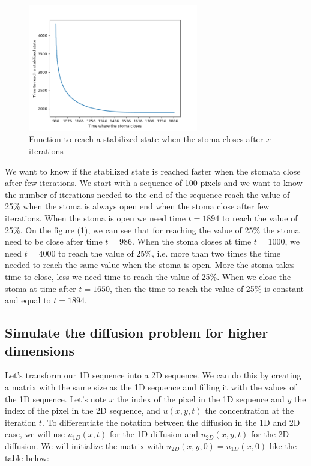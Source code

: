 \begin{figure}[htb]
    \center
    \includegraphics[width=0.66\textwidth]{figures/function_to_reach_a_stabilized_state_when_the_stoma_closes.png}
    \caption{Function to reach a stabilized state when the stoma closes after $x$ iterations}
    \label{fig:s_time_close}
\end{figure}

We want to know if the stabilized state is reached faster when the stomata close after
few iterations. We start with a sequence of 100 pixels and we want to know the number
of iterations needed to the end of the sequence reach the value of 25\% when the stoma
is always open end when the stoma close after few iterations. When the stoma is open
we need time $t=1894$ to reach the value of 25\%. On the figure 
(\ref{fig:s_time_close}), we can see that for reaching the value of 25\% the stoma
need to be close after time $t=986$. When the stoma closes at time $t=1000$, we need 
$t=4000$ to reach the value of 25\%, i.e. more than two times the time needed to reach
the same value when the stoma is open. More the stoma takes time to close, less we 
need time to reach the value of 25\%. When we close the stoma at time after $t=1650$,
then the time to reach the value of 25\% is constant and equal to $t=1894$.

\subsection{Simulate the diffusion problem for higher dimensions}

Let's transform our 1D sequence into a 2D sequence. We can do this by creating a
matrix with the same size as the 1D sequence and filling it with the values of the 
1D sequence. Let's note $x$ the index of the pixel in the 1D sequence and $y$ the index 
of the pixel in the 2D sequence, and $u(x,y,t)$ the concentration at the iteration $t$.
To differentiate the notation between the diffusion in the 1D and 2D case, we will use
$u_{1D}(x,t)$ for the 1D diffusion and $u_{2D}(x,y,t)$ for the 2D diffusion.
We will initialize the matrix with $u_{2D}(x,y,0) = u_{1D}(x,0)$ like the table below:

